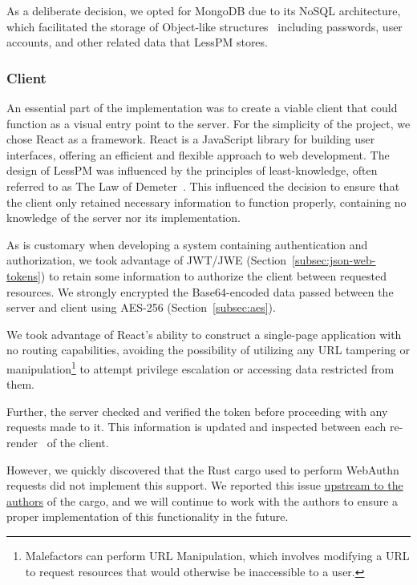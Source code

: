 As a deliberate decision, we opted for MongoDB due to its NoSQL architecture,
which facilitated the storage of Object-like structures~\cite{mongodb2021nosql}
including passwords, user accounts, and other related data that LessPM stores.

\subsubsection{Client}
An essential part of the implementation was to create a viable client that could
function as a visual entry point to the server.
For the simplicity of the project, we chose React as a framework.
React is a JavaScript library for building user interfaces, offering an
efficient and flexible approach to web development.
The design of LessPM was influenced by the principles of least-knowledge,
often referred to as The Law of Demeter~\cite{lieberherr1990assuring}.
This influenced the decision to ensure that the client only retained
necessary information to function properly, containing no knowledge of
the server nor its implementation.

As is customary when developing a system containing authentication and
authorization, we took advantage of JWT/JWE
(Section~\ref{subsec:json-web-tokens})
to retain some information to authorize the client between requested resources.
We strongly encrypted the Base64-encoded data passed between the server and
client using AES-256 (Section~\ref{subsec:aes}).

We took advantage of React's ability to construct a single-page application with
no routing capabilities, avoiding the possibility of utilizing any URL tampering
or manipulation\footnote{
  Malefactors can perform URL Manipulation, which involves modifying a URL to
  request resources that would otherwise be inaccessible to a user.
} to attempt privilege escalation or accessing data restricted from them.

Further, the server checked and verified the token before proceeding with any
requests made to it.
This information is updated and inspected between each
re-render~\cite{react-component} of the client.

However, we quickly discovered that the Rust cargo used to perform WebAuthn
requests did not implement this support.
We reported this issue
\href{https://github.com/kanidm/webauthn-rs/issues/288}{upstream to the authors}
of the cargo, and we will continue to work with the authors to ensure a proper
implementation of this functionality in the future.

